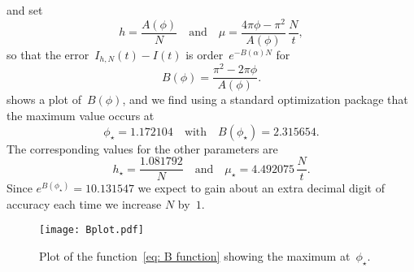 \documentclass[12pt,a4paper]{article}
\begin{document}
and set
\[
h=\frac{A(\phi)}{N}\quad\text{and}\quad
\mu=\frac{4\pi\phi-\pi^2}{A(\phi)}\,\frac{N}{t},
\]
so that the error~$I_{h,N}(t)-I(t)$ is order~$e^{-B(\alpha)N}$ for
\begin{equation}\label{eq: B function}
B(\phi)=\frac{\pi^2-2\pi\phi}{A(\phi)}.
\end{equation}
 shows a plot of~$B(\phi)$, and we find using a standard 
optimization package that the maximum value occurs at
\[
\phi_\star=1.172104\quad\text{with}\quad B(\phi_\star)=2.315654.
\]
The corresponding values for the other parameters are
\[
h_\star=\frac{1.081792}{N}\quad\text{and}\quad
\mu_\star=4.492075\,\frac{N}{t}.
\]
Since $e^{B(\phi_\star)}=10.131547$ we expect to gain about an extra decimal
digit of accuracy each time we increase $N$ by~$1$.



\begin{figure}
\caption{Plot of the function~\eqref{eq: B function} showing the 
maximum at~$\phi_\star$.}\label{fig: B plot}
\begin{center}
\texttt{[image: Bplot.pdf]}
\end{center}
\end{figure}
\end{document}
